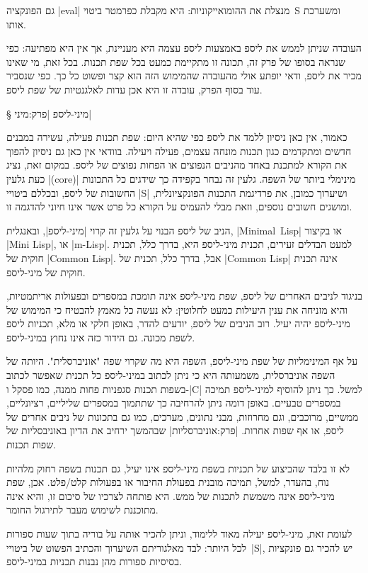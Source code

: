 גם הפונקציה \E|eval| מנצלת את ההומואייקוניות: היא מקבלת כפרמטר ביטוי~S ומשערכת
אותו.

העובדה שניתן לממש את ליספ באמצעות ליספ עצמה היא מעניינת, אך אין היא מפתיעה: כפי
שנראה בסופו של פרק זה, תכונה זו מתקיימת כמעט בכל שפת תכנות. בכל זאת, מי שאינו
מכיר את ליספ, ודאי יופתע אולי מהעובדה שהמימוש הזה הוא קצר ופשוט כל כך. כפי
שנסביר עוד בסוף הפרק, עובדה זו היא אכן עדות לאלגנטיות של שפת ליספ.

§ מיני-ליספ
|פרק:מיני|

כאמור, אין כאן ניסיון ללמד את ליספ כפי שהיא היום: שפת תכנות פעילה, עשירה
במבנים חדשים ומתקדמים כגון תכנות מונחה עצמים, פעילה ויעילה. בוודאי אין כאן גם
ניסיון להפוך את הקורא למתכנת באחד מהניבים הנפוצים או הפחות נפוצים של ליספ.
במקום זאת, נציג כעת גלעין \E|(core)| מינימלי ביותר של השפה. גלעין זה נבחר
בקפידה כך שידגים כל התכונות החשובות של ליספ, ובכללם ביטויי \E|S| ושיערוך כמובן,
את פרדיגמת התכנות הפונקציונלית, ומושגים חשובים נוספים, וזאת מבלי להעמיס על
הקורא כל פרט אשר אינו חיוני להדגמה זו.

הניב של ליספ הבנוי על גלעין זה קרוי \ע|מיני-ליספ|, ובאנגלית, \E|Minimal~Lisp|
או בקיצור \E|Mini Lisp|, או \E|m-Lisp|. למעט הבדלים זעירים, תכנית מיני-ליספ
היא, בדרך כלל, תכנית חוקית של \E|Common Lisp|. אבל, בדרך כלל, תכנית של
\E|Common Lisp| אינה תכנית חוקית של מיני-ליספ.

בניגוד לניבים האחרים של ליספ, שפת מיני-ליספ אינה תומכת במספרים ובפעולות
אריתמטיות, והיא מזניחה את ענין היעילות כמעט לחלוטין: לא נעשה כל מאמץ להבטיח כי
המימוש של מיני-ליספ יהיה יעיל. רוב הניבים של ליספ, יודעים להדר, באופן
חלקי או מלא, תכניות ליספ לשפת מכונה. גם הידור כזה אינו נחוץ במיני-ליספ.

על אף המינימליות של שפת מיני-ליספ, השפה היא מה שקרוי שפה "אוניברסלית". היותה של
השפה אוניברסלית, משמעותה היא כי ניתן לכתוב במיני-ליספ כל תכנית שאפשר לכתוב
בשפות תכנות סגפניות פחות ממנה, כמו פסקל ו-\E|C| למשל. כך ניתן להוסיף למיני-ליספ
תמיכה במספרים טבעיים. באופן דומה ניתן להרחיבה כך שתתמוך במספרים שליליים,
רציונליים, ממשיים, מרוכבים, וגם מחרוזות, מבני נתונים, מערכים, כמו גם בתכונות של
ניבים אחרים של ליספ, או אף שפות אחרות. |פרק:אוניברסליות| שבהמשך ירחיב את
הדיון באוניבסליות של שפות תכנות.

לא זו בלבד שהביצוע של תכניות בשפת מיני-ליספ אינו יעיל, גם תכנות בשפה רחוק
מלהיות נוח, בהעדר, למשל, תמיכה מובנית בפעולת החיבור או בפעולות קלט/פלט. אכן,
שפת מיני-ליספ אינה משמשת לתכנות של ממש. היא פותחה לצרכיו של סיכום זו, והיא אינה
מתוכננת לשימוש מעבר לתירגול החומר.

לעומת זאת, מיני-ליספ יעילה מאוד ללימוד, וניתן להכיר אותה על בוריה בתוך שעות
ספורות לכל היותר: לבד מאלגוריתם השיערוך והכתיב הפשוט של ביטויי~\E|S|, יש להכיר
גם פונקציות בסיסיות ספורות מהן נבנות תכניות במיני-ליספ.

